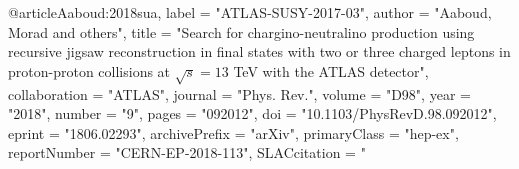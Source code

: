 @article{Aaboud:2018sua,
      label          = "ATLAS-SUSY-2017-03",
      author         = "Aaboud, Morad and others",
      title          = "{Search for chargino-neutralino production using
                        recursive jigsaw reconstruction in final states with two
                        or three charged leptons in proton-proton collisions at
                        $\sqrt{s}=13$ TeV with the ATLAS detector}",
      collaboration  = "ATLAS",
      journal        = "Phys. Rev.",
      volume         = "D98",
      year           = "2018",
      number         = "9",
      pages          = "092012",
      doi            = "10.1103/PhysRevD.98.092012",
      eprint         = "1806.02293",
      archivePrefix  = "arXiv",
      primaryClass   = "hep-ex",
      reportNumber   = "CERN-EP-2018-113",
      SLACcitation   = "%
}

